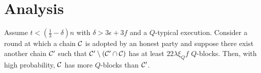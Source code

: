 \section{Analysis}

\begin{lemma}\label{lemma:qblockcommonprefix}
	Assume $t<(\frac{1}{3}-\delta)n$ with $\delta>3\epsilon+3f$ and a $Q$-typical
	execution.
	Consider a round at which a chain $\mathcal{C}$ is adopted by an honest party and
	suppose there exist another chain $\mathcal{C}'$ such that
	$\mathcal{C}'\setminus(\mathcal{C}'\cap\mathcal{C})$ has at least $22\lambda\xi_Qf$ $Q$-blocks.
	Then, with high probability, $\mathcal{C}$ has more $Q$-blocks than $\mathcal{C}'$.
\end{lemma}
